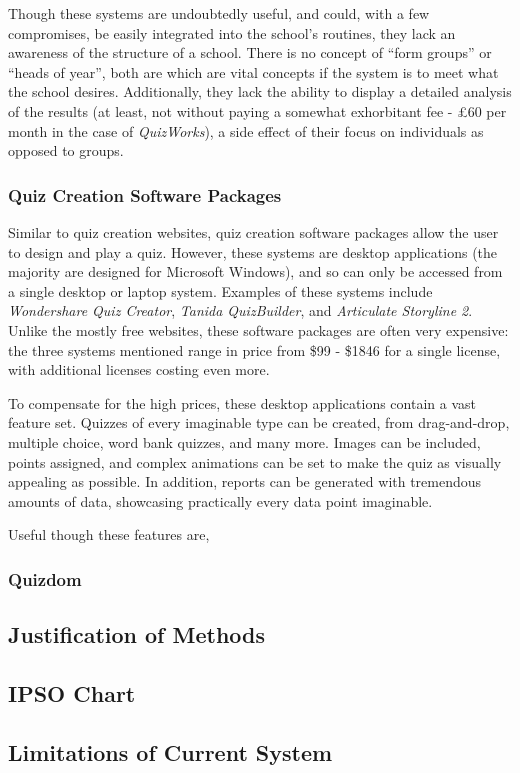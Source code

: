 Though these systems are undoubtedly useful, and could, with a few compromises, be easily integrated into the school's routines, they lack an awareness of the structure of a school. There is no concept of ``form groups'' or ``heads of year'', both are which are vital concepts if the system is to meet what the school desires. Additionally, they lack the ability to display a detailed analysis of the results (at least, not without paying a somewhat exhorbitant fee - \pounds60 per month in the case of \textit{QuizWorks}), a side effect of their focus on individuals as opposed to groups.

\subsubsection{Quiz Creation Software Packages}
Similar to quiz creation websites, quiz creation software packages allow the user to design and play a quiz. However, these systems are desktop applications (the majority are designed for Microsoft Windows), and so can only be accessed from a single desktop or laptop system. Examples of these systems include \textit{Wondershare Quiz Creator}, \textit{Tanida QuizBuilder}, and \textit{Articulate Storyline 2}. Unlike the mostly free websites, these software packages are often very expensive: the three systems mentioned range in price from \$99 - \$1846 for a single license, with additional licenses costing even more.

To compensate for the high prices, these desktop applications contain a vast feature set. Quizzes of every imaginable type can be created, from drag-and-drop, multiple choice, word bank quizzes, and many more. Images can be included, points assigned, and complex animations can be set to make the quiz as visually appealing as possible. In addition, reports can be generated with tremendous amounts of data, showcasing practically every data point imaginable.

Useful though these features are, 

\subsubsection{Quizdom}


\subsection{Justification of Methods}

\subsection{IPSO Chart}

\subsection{Limitations of Current System}
